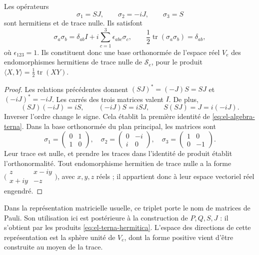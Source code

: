 \begin{proposition}
\label{prop:el-terna-hermitica}
Les opérateurs
\begin{equation}
 \sigma_1=SJ,\qquad \sigma_2=-iJ,\qquad \sigma_3=S
 \label{eq:el-terna-hermitica}
\end{equation}
sont hermitiens et de trace nulle. Ils satisfont
\begin{equation}
 \sigma_a\sigma_b
 =\delta_{ab}I+i\sum_{c=1}^3\epsilon_{abc}\sigma_c,
 \qquad
 \frac12\operatorname{tr}(\sigma_a\sigma_b)=\delta_{ab},
 \label{eq:el-algebra-terna}
\end{equation}
où \(\epsilon_{123}=1\). Ils constituent donc une base orthonormée
de l'espace réel \(V_e\) des endomorphismes hermitiens de trace nulle de
\(\mathscr S_e\), pour le produit
\(\langle X,Y\rangle=\frac12\operatorname{tr}(XY)\).
\end{proposition}
\begin{proof}
Les relations précédentes donnent \((SJ)^*=(-J)S=SJ\) et
\((-iJ)^*=-iJ\). Les carrés des trois matrices valent \(I\).
De plus,
\[
 (SJ)(-iJ)=iS,\qquad (-iJ)S=iSJ,\qquad S(SJ)=J=i(-iJ).
\]
Inverser l'ordre change le signe. Cela établit la première identité
de \eqref{eq:el-algebra-terna}. Dans la base orthonormée du plan principal,
les matrices sont
\[
 \sigma_1=\begin{pmatrix}0&1\\1&0\end{pmatrix},\quad
 \sigma_2=\begin{pmatrix}0&-i\\i&0\end{pmatrix},\quad
 \sigma_3=\begin{pmatrix}1&0\\0&-1\end{pmatrix}.
\]
Leur trace est nulle, et prendre les traces dans l'identité de produit établit
l'orthonormalité. Tout endomorphisme hermitien de trace nulle a la forme
\(\bigl(\begin{smallmatrix}z&x-iy\\x+iy&-z\end{smallmatrix}\bigr)\),
avec \(x,y,z\) réels ; il appartient donc à leur espace vectoriel réel engendré.
\end{proof}

Dans la représentation matricielle usuelle, ce triplet porte le nom de
matrices de Pauli. Son utilisation ici est postérieure à la construction de
\(P,Q,S,J\) : il s'obtient par les produits
\eqref{eq:el-terna-hermitica}. L'espace des directions de cette
représentation est la sphère unité de \(V_e\), dont la forme positive
vient d'être construite au moyen de la trace.

